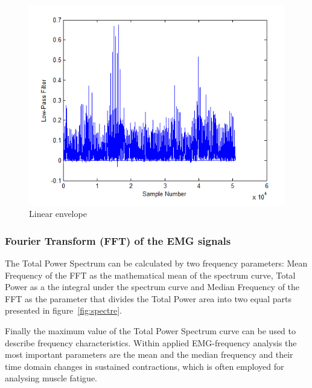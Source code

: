 \documentclass[conference]{IEEEtran}
\begin{document}
\begin{figure}
    \hspace*{1.2 cm}
    \includegraphics[scale=0.40]{fig3.png}
    \caption{Linear envelope}
    \label{fig:env}
\end{figure}

\subsubsection{Fourier Transform (FFT) of the EMG signals} \label{sub:FourierTransform(FFT)oftheEMGsignals}
\par The Total Power Spectrum can be calculated by two frequency parameters: Mean Frequency of the FFT as the mathematical mean of the spectrum curve, Total Power as a the integral under the spectrum curve and Median Frequency of the FFT as the parameter that divides the Total Power area into two equal parts~\cite{Konrad} presented in figure~\ref{fig:spectre}. \par
Finally the maximum value of the Total Power Spectrum curve can be used to describe frequency characteristics. Within applied EMG-frequency analysis the most important parameters are the mean and the median frequency and their time domain changes in sustained contractions, which is often employed for analysing muscle fatigue.\par
\end{document}
